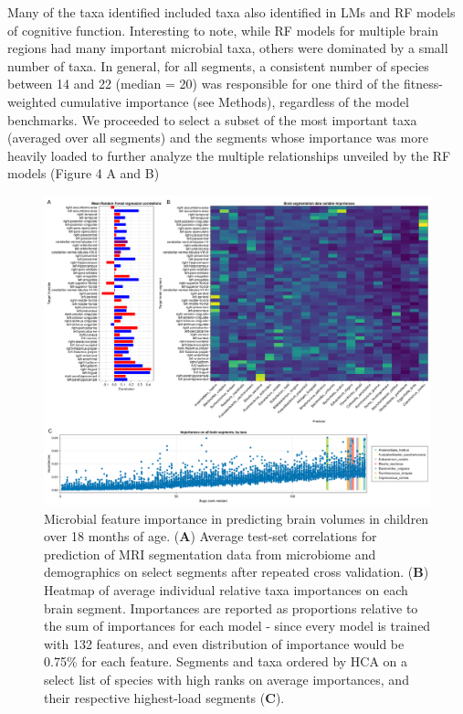 \documentclass{article}
\begin{document}
Many of the taxa identified included taxa also identified in LMs and RF
models of cognitive function. Interesting to note, while RF models for
multiple brain regions had many important microbial taxa, others were
dominated by a small number of taxa. In general, for all segments, a
consistent number of species between 14 and 22 (median = 20) was
responsible for one third of the fitness-weighted cumulative importance
(see Methods), regardless of the model benchmarks. We proceeded to
select a subset of the most important taxa (averaged over all segments)
and the segments whose importance was more heavily loaded to further
analyze the multiple relationships unveiled by the RF models
(Figure 4 A and B)

\begin{figure}
    \centering
    \includegraphics[width=\textwidth]{assets/Figure4.png}
    \caption{
        Microbial feature importance in predicting brain volumes in children over 18 months of age.
        (\textbf{A}) Average test-set correlations for prediction of MRI segmentation
        data from microbiome and demographics on select segments after repeated
        cross validation. (\textbf{B}) Heatmap of average individual relative taxa
        importances on each brain segment. Importances are reported as
        proportions relative to the sum of importances for each model - since
        every model is trained with 132 features, and even distribution of
        importance would be 0.75\% for each feature. Segments and taxa ordered
        by HCA on a select list of species with high ranks on average importances,
        and their respective highest-load segments (\textbf{C}).
    }
    \label{fig:4}
\end{figure}
\end{document}
